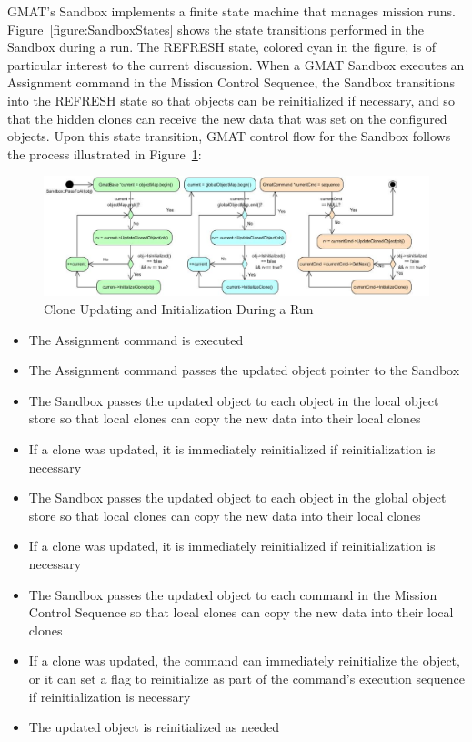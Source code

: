 \documentclass[10pt,letterpaper]{article}
\begin{document}
GMAT's Sandbox implements a finite state machine that manages mission runs.  Figure~\ref{figure:SandboxStates} shows the state transitions performed in the Sandbox during a run.  The REFRESH state, colored cyan in the figure, is of particular interest to the current discussion.  When a GMAT Sandbox executes an Assignment command in the Mission Control Sequence, the Sandbox transitions into the REFRESH state so that objects can be reinitialized if necessary, and so that the hidden clones can receive the new data that was set on the configured objects.  Upon this state transition, GMAT control flow for the Sandbox follows the process illustrated in Figure~\ref{figure:SandboxReinitialization}:

\begin{figure}[htb]
\begin{center}
\includegraphics[scale=0.48]{Images/SandboxCloneUpdates.eps}
\caption{\label{figure:SandboxReinitialization}Clone Updating and Initialization During a Run}
\end{center}
\end{figure}

\begin{itemize}
\item The Assignment command is executed
\item The Assignment command passes the updated object pointer to the Sandbox
\item The Sandbox passes the updated object to each object in the local object store so that local clones can copy the new data into their local clones
\item If a clone was updated, it is immediately reinitialized if reinitialization is necessary
\item The Sandbox passes the updated object to each object in the global object store so that local clones can copy the new data into their local clones
\item If a clone was updated, it is immediately reinitialized if reinitialization is necessary
\item The Sandbox passes the updated object to each command in the Mission Control Sequence so that local clones can copy the new data into their local clones
\item If a clone was updated, the command can immediately reinitialize the object, or it can set a flag to reinitialize as part of the command's execution sequence if reinitialization is necessary
\item The updated object is reinitialized as needed
\end{itemize}
\end{document}
